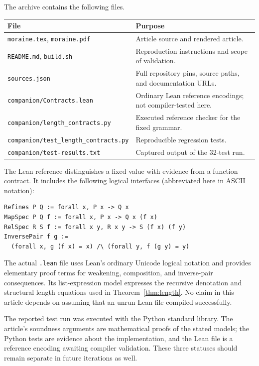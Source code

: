 \documentclass[11pt,letterpaper]{article}
\newcommand{\code}[1]{\nolinkurl{#1}}
\theoremstyle{definition}
\theoremstyle{remark}
\begin{document}
The archive contains the following files.
\begin{center}\small
\begin{tabularx}{\linewidth}{@{}P{.45\linewidth}Y@{}}
\toprule File & Purpose\\\midrule
\code{moraine.tex}, \code{moraine.pdf} & Article source and rendered article.\\
\code{README.md}, \code{build.sh} & Reproduction instructions and scope of validation.\\
\code{sources.json} & Full repository pins, source paths, and documentation URLs.\\
\code{companion/Contracts.lean} & Ordinary Lean reference encodings; not compiler-tested here.\\
\code{companion/length_contracts.py} & Executed reference checker for the fixed grammar.\\
\code{companion/test_length_contracts.py} & Reproducible regression tests.\\
\code{companion/test-results.txt} & Captured output of the 32-test run.\\
\bottomrule
\end{tabularx}\end{center}

The Lean reference distinguishes a fixed value with evidence from a function
contract. It includes the following logical interfaces (abbreviated here in
ASCII notation):
\begin{lstlisting}
Refines P Q := forall x, P x -> Q x
MapSpec P Q f := forall x, P x -> Q x (f x)
RelSpec R S f := forall x y, R x y -> S (f x) (f y)
InversePair f g :=
  (forall x, g (f x) = x) /\ (forall y, f (g y) = y)
\end{lstlisting}
The actual \code{.lean} file uses Lean's ordinary Unicode logical notation and
provides elementary proof terms for weakening, composition, and inverse-pair
consequences. Its list-expression model expresses the recursive denotation and
structural length equations used in Theorem~\ref{thm:length}. No claim in this
article depends on assuming that an unrun Lean file compiled successfully.

The reported test run was executed with the Python standard library. The
article's soundness arguments are mathematical proofs of the stated models;
the Python tests are evidence about the implementation, and the Lean file is a
reference encoding awaiting compiler validation. These three statuses should
remain separate in future iterations as well.
\end{document}
